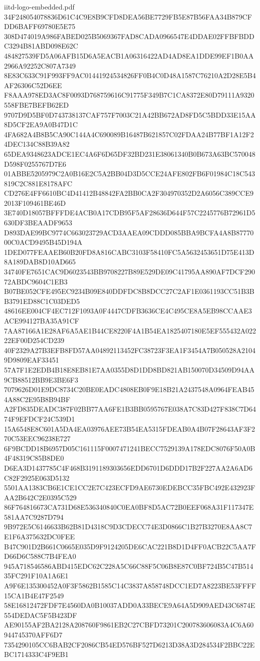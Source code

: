 \begin{filecontents*}[overwrite]{iitd-logo-embedded.pdf}
34F248054078836D61C4C9E8B9CFD8DEA56BE7729FB5E87B56FAA34B879CFDD6BAFF69780E5E75
308D474019A986FABED025B5069367FAD8CADA0966547E4DDAE02FFBFBDDC3294B81ABD098E62C
484827539FD5A06AFB15D6A5EACB1A06316422AD4AD8EA1DDE99EF1B0AA2966A92252C807A7349
8E83C633C91F993FF9AC01441924534826FF0B4C0D48A1587C76210A2D28E5B4AF26306C52D6EE
F8AAA978ED3AC8F0093D768759616C91775F349B7C1CA8372E80D79111A9320558FBE7BEFB62ED
9707D9D5BF0D743738137CAF757F7003C21A42BB672AD8FD5C5BDD33E15AA8D5CF2EA9A0B47D1C
4FA682A4B8B5CA90C144A4C690089B16487B621857C02FDAA24B77BF1A12F24DEC134C88B39A82
65DEA9348623ADCE1EC4A6F6D65DF32BD231E38061340B0B673A63BC570048D598F0255767D7E6
01ABBE5205979C2A0B16E2C5A2BB04D3D5CCE24AFE802FB6F01984C18C543819C2C881E8178AFC
CD276E4FF6610BC4D41412B48842FA2BB0CA2F304970352D2A6056C389CCE92013F109461BE46D
3E740D18057BFFFDE4ACB0A17CDB95F5AF28636D644F57C2245776B72961D5630DF3BEAADF9653
D893DAE99BC9774C663023729ACD3AAEA09CDDD085BBA9BCFA4A8B8777000C0ACD9495B45D194A
1DED077FEAAEB60B20FD8A816CABC3103F58410FC5A5632453651D75E413D8A189DAB8D10AD665
34740FE7651CAC9D6023543BB9708227B89E529DE09C41795AA890AF7DCF29072ABDC9604C1EB3
B07BE052CFE495EC9234B09E840DDFDC8B8DCC27C2AF1E0361193CC51B3BB3791ED88C1C03DED5
48616EE004CF4EC712F1093A0F4447CDFB3636CE4C495CE8A5EB98CCAAE3ACE994127BA35A91CF
7AA87166A1E28AF6A5AE1B44CE8220F4A1B54EA1825407180E5EF555432A02222EF00D254CD239
40F2329A27B3EFB8FD57AA04892113452FC38723F3EA1F3454A7B050528A21049D9809EAF33451
57A7F1E2EDB4B18E8EB81E7AA0355D8D1DD8BD821AB150070D34509D94AA9CB88512BB9E3BE6F3
7079626D01E9DC8734C20BE0EADC4808EB0F9E18B21A2437548A0964FEAB454A88C2E95B8B94BF
A2FD835DEADC387F02BB77AA6FE1B3BB0595767E038A7C83D427F838C7D6474F9EFDCF24C539D1
15A6548E8C601A5DA4EA03976AEE73B54EA5315FDEAB0A4B07F28643AF3F270C53EEC96238E727
6F9BCDD18B6957D05C161115F0007471241BECC7529139A178EDC8076F50A0B4F48319C85B8DE0
D6EA3D1437785C4F468B3191189303656EDD6701D6DDD17B2F227AA2A6AD6C82F2925E063D5132
5501AA1383CB6E1CE1CC2E7C423ECFD9AE6730EDEBCC35FBC492E432923FAA2B642C2E0395C529
86F764816673CA731D68E536340840C0EA0BF8D5AC72B0EEF068A31F117347E581AA7C9287D794
9B972E5C6146633B62B81D4318C9D3CDECC74E3D0866C1B27B3270E8AA8C7E1F6A375632DC0FEE
B47C901D2B661C0665E035D9F9124205DE6CAC221B8D1D4FF0ACB22C5AA7FD66D6C588C7B4FEA0
945A718546586ABD415EDC62C228A5C66C88F5C06B8E87C0BF724B5C47B51435FC291F10A1A6E1
A9F6E135300452A0F3F5862B1585C14C3837A858748DCC1ED7A8223BE53FFFF15CA1B4E47F2549
58E16812472FDF7E4560DA0B10037ADD0A33BECE9A64A5D909AED43C6874E554DEDAC5F5B423DF
AE90155AF2BA2128A208760F9861EB2C27CBFD73201C200783606083A4C6A60944745370AFF6D7
7354290105CC6BAB2CF2086CB54ED576BF527D6213D38A3D284534F2BBC22EBC1714333C4F9EB1

\end{filecontents*}
